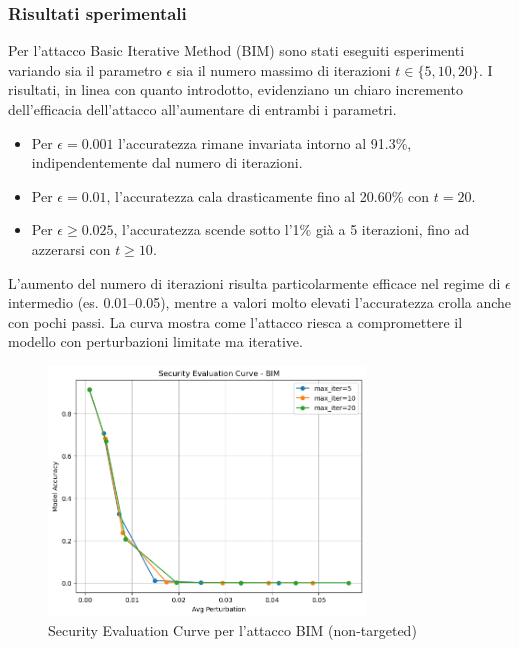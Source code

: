             \subsubsection*{Risultati sperimentali}
                \noindent Per l'attacco Basic Iterative Method (BIM) sono stati eseguiti esperimenti variando sia il parametro $\epsilon$ sia il numero massimo di iterazioni $t \in \{5, 10, 20\}$. I risultati, in linea con quanto introdotto, evidenziano un chiaro incremento dell'efficacia dell'attacco all'aumentare di entrambi i parametri.
                
                \begin{itemize}
                    \item Per $\epsilon = 0.001$ l’accuratezza rimane invariata intorno al 91.3\%, indipendentemente dal numero di iterazioni.
                    
                    \item Per $\epsilon = 0.01$, l’accuratezza cala drasticamente fino al 20.60\% con $t=20$.
                    
                    \item Per $\epsilon \geq 0.025$, l’accuratezza scende sotto l’1\% già a 5 iterazioni, fino ad azzerarsi con $t \geq 10$.
                \end{itemize}
                
                \noindent L’aumento del numero di iterazioni risulta particolarmente efficace nel regime di $\epsilon$ intermedio (es. 0.01–0.05), mentre a valori molto elevati l’accuratezza crolla anche con pochi passi. La curva mostra come l’attacco riesca a compromettere il modello con perturbazioni limitate ma iterative.

                \begin{figure}[H]
                    \centering
                    \includegraphics[width=0.75\textwidth]{images/evaluation_curve_bim.png}
                    \caption{Security Evaluation Curve per l'attacco BIM (non-targeted)}
                \end{figure}

